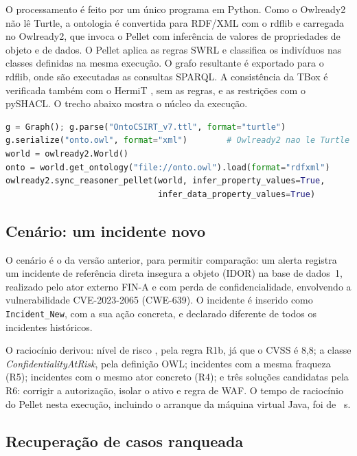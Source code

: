\documentclass[12pt]{article}
\newcommand{\oc}[1]{\texttt{#1}}
\begin{document}
O processamento é feito por um único programa em Python. Como o Owlready2 \cite{owlready} não lê Turtle, a ontologia é convertida para RDF/XML com o rdflib e carregada no Owlready2, que invoca o Pellet \cite{pellet} com inferência de valores de propriedades de objeto e de dados. O Pellet aplica as regras SWRL e classifica os indivíduos nas classes definidas na mesma execução. O grafo resultante é exportado para o rdflib, onde são executadas as consultas SPARQL. A consistência da TBox é verificada também com o HermiT \cite{hermit}, sem as regras, e as restrições com o pySHACL. O trecho abaixo mostra o núcleo da execução.

\begin{lstlisting}[language=Python]
g = Graph(); g.parse("OntoCSIRT_v7.ttl", format="turtle")
g.serialize("onto.owl", format="xml")        # Owlready2 nao le Turtle
world = owlready2.World()
onto = world.get_ontology("file://onto.owl").load(format="rdfxml")
owlready2.sync_reasoner_pellet(world, infer_property_values=True,
                               infer_data_property_values=True)
\end{lstlisting}

\subsection{Cenário: um incidente novo}

O cenário é o da versão anterior, para permitir comparação: um alerta registra um incidente de referência direta insegura a objeto (IDOR) na base de dados~1, realizado pelo ator externo FIN-A e com perda de confidencialidade, envolvendo a vulnerabilidade CVE-2023-2065 (CWE-639). O incidente é inserido como \oc{Incident\_New}, com a sua ação concreta, e declarado diferente de todos os incidentes históricos.

O raciocínio derivou: nível de risco \emph{\scenRisk}, pela regra R1b, já que o CVSS é 8,8; a classe \emph{ConfidentialityAtRisk}, pela definição OWL; \scenSharesW{} incidentes com a mesma fraqueza (R5); \scenSharesA{} incidentes com o mesmo ator concreto (R4); e três soluções candidatas pela R6: corrigir a autorização, isolar o ativo e regra de WAF. O tempo de raciocínio do Pellet nesta execução, incluindo o arranque da máquina virtual Java, foi de \scenSec{}~s.

\subsection{Recuperação de casos ranqueada}
\end{document}
